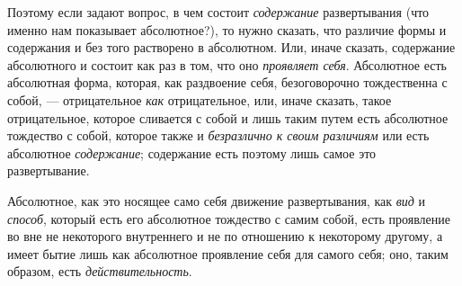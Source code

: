 Поэтому если задают вопрос, в чем состоит
{\em содержание} развертывания (что именно нам
показывает абсолютное?), то нужно сказать, что различие формы и содержания
и без того растворено в абсолютном. Или, иначе сказать, содержание
абсолютного и состоит как раз в том, что оно
{\em проявляет себя}. Абсолютное есть абсолютная форма,
которая, как раздвоение себя, безоговорочно тождественна с собой, —
отрицательное {\em как} отрицательное, или, иначе
сказать, такое отрицательное, которое сливается с собой и лишь таким путем
есть абсолютное тождество с собой, которое также и
{\em безразлично к своим различиям} или есть абсолютное
{\em содержание}; содержание есть поэтому лишь самое
это развертывание.

Абсолютное, как это носящее само себя движение развертывания, как
{\em вид} и {\em способ}, который
есть его абсолютное тождество с самим собой, есть проявление во вне не
некоторого внутреннего и не по отношению к некоторому другому, а имеет
бытие лишь как абсолютное проявление себя для самого себя; оно, таким
образом, есть {\em действительность}.

{\centering
\hypertarget{Toc478978763}{}\newline
~
\par}

